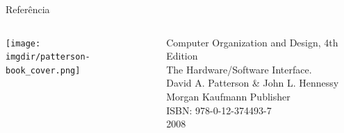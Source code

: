 \begin{frame}{Referência}
  
  \begin{columns}
    \begin{column}{0.3\textwidth}
      
\texttt{[image: \\imgdir/patterson-book\_cover.png]}

    \end{column}
    \begin{column}{0.7\textwidth}
\small
      Computer Organization and Design, 4th Edition\\
      The Hardware/Software Interface.\\
      David A. Patterson  \&  John L. Hennessy \\
      Morgan Kaufmann Publisher\\
      ISBN: 978-0-12-374493-7\\
      2008
    \end{column}
  \end{columns}

\end{frame}




\subsection{\insertlecture}

